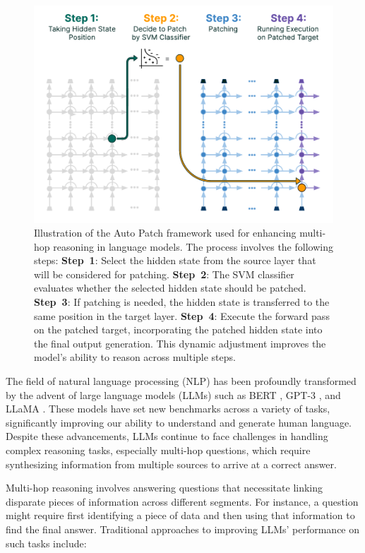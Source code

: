 \documentclass[11pt]{article}
\begin{document}
\begin{figure}[!ht]
    \centering
    \includegraphics[width=\columnwidth]{figures/autopatch.pdf}
    \vspace{-.5cm}
    \caption{Illustration of the Auto Patch framework used for enhancing multi-hop reasoning in language models. The process involves the following steps:
    \textbf{Step~1}: Select the hidden state from the source layer that will be considered for patching.
    \textbf{Step~2}: The SVM classifier evaluates whether the selected hidden state should be patched.
    \textbf{Step~3}: If patching is needed, the hidden state is transferred to the same position in the target layer.
    \textbf{Step~4}: Execute the forward pass on the patched target, incorporating the patched hidden state into the final output generation. This dynamic adjustment improves the model's ability to reason across multiple steps.}
    \label{fig:autopatch}
\end{figure}


The field of natural language processing (NLP) has been profoundly transformed by the advent of large language models (LLMs) such as BERT \cite{devlin2019bert}, GPT-3 \cite{brown2020language}, and LLaMA \cite{touvron2023llama}. These models have set new benchmarks across a variety of tasks, significantly improving our ability to understand and generate human language. Despite these advancements, LLMs continue to face challenges in handling complex reasoning tasks, especially multi-hop questions, which require synthesizing information from multiple sources to arrive at a correct answer.

Multi-hop reasoning involves answering questions that necessitate linking disparate pieces of information across different segments. For instance, a question might require first identifying a piece of data and then using that information to find the final answer. Traditional approaches to improving LLMs' performance on such tasks include:
\end{document}
